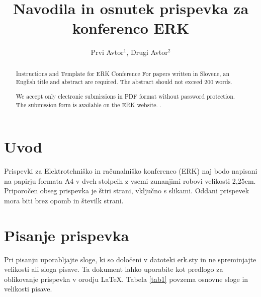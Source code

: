\documentclass[a4paper]{article}
\begin{document}
\title{Navodila in osnutek prispevka za konferenco ERK}

\author{Prvi Avtor$^{1}$, Drugi Avtor$^{2}$} %



\maketitle


\begin{abstract}{Instructions and Template for ERK Conference}
For papers written in Slovene, an English title and abstract are required. The abstract should not exceed 200 words.

We accept only electronic submissions in PDF format without password protection. The submission form is available on the ERK website. \cite{ERK}.
\end{abstract}



\section{Uvod}

Prispevki za Elektrotehniško in računalniško konferenco (ERK) naj bodo napisani na papirju formata A4 v dveh stolpcih z vsemi zunanjimi robovi velikosti 2,25cm. Priporočen obseg prispevka je štiri strani, vključno s slikami. Oddani prispevek mora biti brez opomb in številk strani.

\section{Pisanje prispevka}

Pri pisanju uporabljajte sloge, ki so določeni v datoteki erk.sty in ne spreminjajte velikosti ali sloga pisave. Ta dokument lahko uporabite kot predlogo za oblikovanje prispevka v orodju \LaTeX.
Tabela \ref{tab1} povzema osnovne sloge in velikosti pisave.
\end{document}
